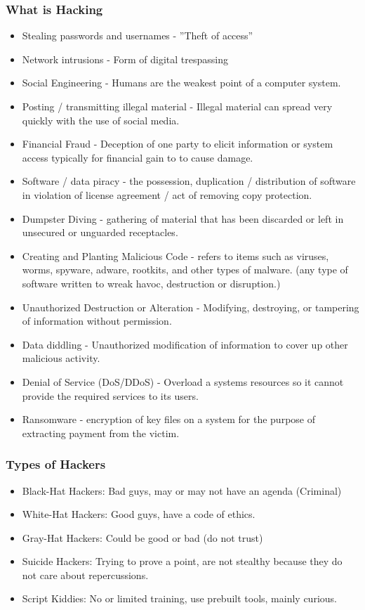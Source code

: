 \subsubsection{What is Hacking}
\begin{itemize}
    \item Stealing passwords and usernames - ''Theft of access'' 
    \item Network intrusions - Form of digital trespassing
    \item Social Engineering - Humans are the weakest point of a computer system.
    \item Posting / transmitting illegal material - Illegal material can spread very quickly with the use of social media.
    \item Financial Fraud - Deception of one party to elicit information or system access typically for financial gain to to cause damage.
    \item Software / data piracy - the possession, duplication / distribution of software in violation of license agreement / act of removing copy protection.
    \item Dumpster Diving - gathering of material that has been discarded or left in unsecured or unguarded receptacles.
    \item Creating and Planting Malicious Code - refers to items such as viruses, worms, spyware, adware, rootkits, and other types of malware. (any type of software written to wreak havoc, destruction or disruption.)
    \item Unauthorized Destruction or Alteration - Modifying, destroying, or tampering of information without permission.
    \item Data diddling - Unauthorized modification of information to cover up other malicious activity.
    \item Denial of Service (DoS/DDoS) - Overload a systems resources so it cannot provide the required services to its users.
    \item Ransomware - encryption of key files on a system for the purpose of extracting payment from the victim.
\end{itemize}

\subsubsection{Types of Hackers}
\begin{itemize}
    \item Black-Hat Hackers: Bad guys, may or may not have an agenda (Criminal)
    \item White-Hat Hackers: Good guys, have a code of ethics.
    \item Gray-Hat Hackers: Could be good or bad (do not trust)
    \item Suicide Hackers: Trying to prove a point, are not stealthy because they do not care about repercussions.
    \item Script Kiddies: No or limited training, use prebuilt tools, mainly curious.
\end{itemize}

